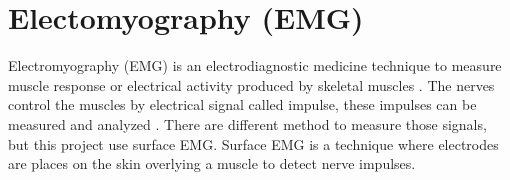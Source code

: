 \section{Electomyography (EMG)}
Electromyography (EMG) is an electrodiagnostic medicine technique to measure muscle response or electrical activity produced by skeletal muscles \cite{wiki:Electromyography}. The nerves control the muscles by electrical signal called impulse, these impulses can be measured and analyzed \cite{WebMD:Electromyogram}. There are different method to measure those signals, but this project use surface EMG. Surface EMG is a technique where electrodes are places on the skin overlying a muscle to detect nerve impulses. 